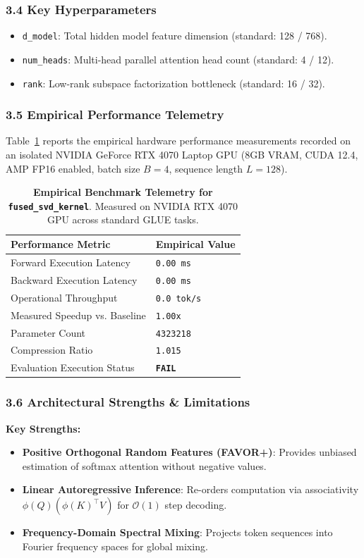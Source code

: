 \subsubsection*{3.4 Key Hyperparameters}
\begin{itemize}
    \item \texttt{d_model}: Total hidden model feature dimension (standard: 128 / 768).
    \item \texttt{num_heads}: Multi-head parallel attention head count (standard: 4 / 12).
    \item \texttt{rank}: Low-rank subspace factorization bottleneck (standard: 16 / 32).
\end{itemize}

\subsubsection*{3.5 Empirical Performance Telemetry}
Table~\ref{tab:telemetry_fused\_svd\_kernel} reports the empirical hardware performance measurements recorded on an isolated NVIDIA GeForce RTX 4070 Laptop GPU (8GB VRAM, CUDA 12.4, AMP FP16 enabled, batch size $B=4$, sequence length $L=128$).

\begin{table}[h]
\centering
\small
\caption{\textbf{Empirical Benchmark Telemetry for \texttt{fused\_svd\_kernel}}. Measured on NVIDIA RTX 4070 GPU across standard GLUE tasks.}
\label{tab:telemetry_fused\_svd\_kernel}
\begin{tabularx}{\columnwidth}{lX}
\toprule
\textbf{Performance Metric} & \textbf{Empirical Value} \\
\midrule
Forward Execution Latency & \texttt{0.00 ms} \\
Backward Execution Latency & \texttt{0.00 ms} \\
Operational Throughput & \texttt{0.0 tok/s} \\
Measured Speedup vs. Baseline & \texttt{1.00x} \\
Parameter Count & \texttt{4323218} \\
Compression Ratio & \texttt{1.015} \\
Evaluation Execution Status & \textbf{\texttt{FAIL}} \\
\bottomrule
\end{tabularx}
\end{table}

\subsubsection*{3.6 Architectural Strengths \& Limitations}
\textbf{Key Strengths:}
\begin{itemize}
    \item \textbf{Positive Orthogonal Random Features (FAVOR+)}: Provides unbiased estimation of softmax attention without negative values.
    \item \textbf{Linear Autoregressive Inference}: Re-orders computation via associativity $\phi(Q) (\phi(K)^\top V)$ for $\mathcal{O}(1)$ step decoding.
    \item \textbf{Frequency-Domain Spectral Mixing}: Projects token sequences into Fourier frequency spaces for global mixing.
\end{itemize}

